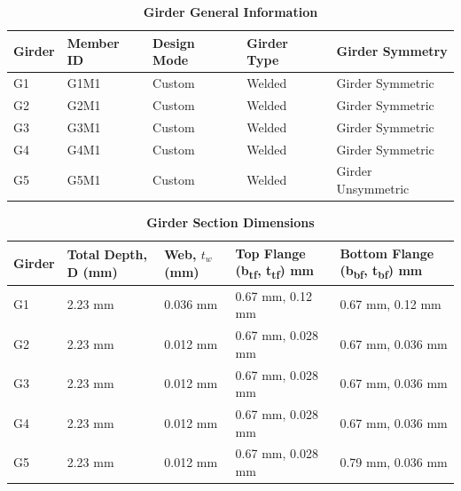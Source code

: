 \documentclass[12pt,a4paper]{report}
\numberwithin{table}{chapter}
\numberwithin{figure}{chapter}
\begin{document}
\newpage

\vspace{0.4em}
\noindent
            
\vspace{4pt}
\begin{longtable}{|L{2.2cm}|L{1.8cm}|p{3.8cm}|p{3.8cm}|p{3.8cm}|}
\caption{\textbf{Girder General Information}}
\hline
\textbf{Girder} & \textbf{Member ID} & \textbf{Design Mode} & \textbf{Girder Type} & \textbf{Girder Symmetry} \\[6pt]
\hline
G1 & G1M1 & Custom & Welded & Girder Symmetric \\[8pt]
\hline
G2 & G2M1 & Custom & Welded & Girder Symmetric \\[8pt]
\hline
G3 & G3M1 & Custom & Welded & Girder Symmetric \\[8pt]
\hline
G4 & G4M1 & Custom & Welded & Girder Symmetric \\[8pt]
\hline
G5 & G5M1 & Custom & Welded & Girder Unsymmetric \\[8pt]
\hline
\end{longtable}

\vspace{0.6em}

\vspace{4pt}
\begin{longtable}{|L{1.8cm}|L{2.3cm}|L{1.8cm}|p{4.8cm}|p{4.8cm}|}
\caption{\textbf{Girder Section Dimensions}}
\hline
\textbf{Girder} & \textbf{Total Depth, D (mm)} & \textbf{Web, $t_w$ (mm)} & \textbf{Top Flange (b\textsubscript{tf}, t\textsubscript{tf}) mm} & \textbf{Bottom Flange (b\textsubscript{bf}, t\textsubscript{bf}) mm} \\[6pt]
\hline
G1 & 2.23 mm & 0.036 mm & 0.67 mm, 0.12 mm & 0.67 mm, 0.12 mm \\[8pt]
\hline
G2 & 2.23 mm & 0.012 mm & 0.67 mm, 0.028 mm & 0.67 mm, 0.036 mm \\[8pt]
\hline
G3 & 2.23 mm & 0.012 mm & 0.67 mm, 0.028 mm & 0.67 mm, 0.036 mm \\[8pt]
\hline
G4 & 2.23 mm & 0.012 mm & 0.67 mm, 0.028 mm & 0.67 mm, 0.036 mm \\[8pt]
\hline
G5 & 2.23 mm & 0.012 mm & 0.67 mm, 0.028 mm & 0.79 mm, 0.036 mm \\[8pt]
\hline
\end{longtable}

\vspace{0.6em}
\end{document}
